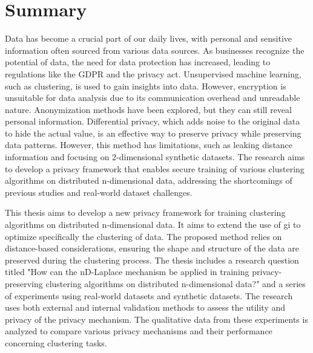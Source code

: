 \chapter{Summary}
Data has become a crucial part of our daily lives, with personal and sensitive information often sourced from various data sources. As businesses recognize the potential of data, the need for data protection has increased, leading to regulations like the GDPR and the privacy act. Unsupervised machine learning, such as clustering, is used to gain insights into data. However, encryption is unsuitable for data analysis due to its communication overhead and unreadable nature. Anonymization methods have been explored, but they can still reveal personal information. Differential privacy, which adds noise to the original data to hide the actual value, is an effective way to preserve privacy while preserving data patterns. However, this method has limitations, such as leaking distance information and focusing on 2-dimensional synthetic datasets. The research aims to develop a privacy framework that enables secure training of various clustering algorithms on distributed n-dimensional data, addressing the shortcomings of previous studies and real-world dataset challenges. \newline

This thesis aims to develop a new privacy framework for training clustering algorithms on distributed n-dimensional data. It aims to extend the use of \gls{gi} to optimize specifically the clustering of data. The proposed method relies on distance-based considerations, ensuring the shape and structure of the data are preserved during the clustering process. The thesis includes a research question titled "How can the nD-Laplace mechanism be applied in training privacy-preserving clustering algorithms on distributed n-dimensional data?" and a series of experiments using real-world datasets and synthetic datasets. The research uses both external and internal validation methods to assess the utility and privacy of the privacy mechanism. The qualitative data from these experiments is analyzed to compare various privacy mechanisms and their performance concerning clustering tasks.